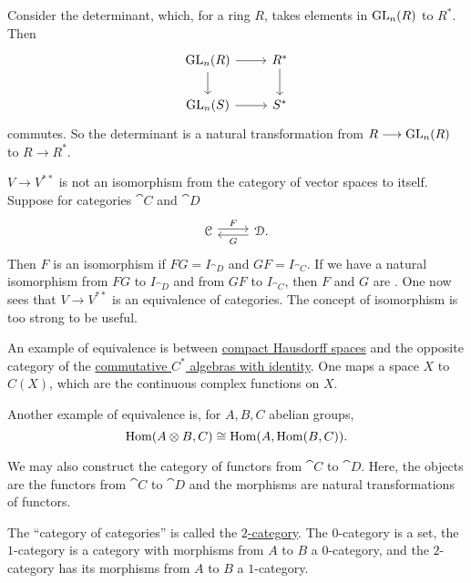 \documentclass[11pt, oneside]{article}
\begin{document}
Consider the determinant, which, for a ring $R$, takes elements in $\operatorname{GL}_n(R) $ to $R^*$. Then
\[
\begin{tikzcd}
\GL_n(R) \arrow[r] \arrow[d] & R^* \arrow[d]\\ \GL_n(S)  \arrow[r] & S^*
\end{tikzcd}
\]
commutes. So the determinant is a natural transformation from $R\longrightarrow \operatorname{GL}_n(R)$ to $R\longrightarrow R^*$.

$V\longrightarrow V^{**}$ is not an isomorphism from the category of vector spaces to itself. Suppose for categories $\cat C$ and $\cat D$
\[
\begin{tikzcd}
\cat C \arrow[r, shift left, "F"] & \cat D. \arrow[l, shift left, "G"]
\end{tikzcd}
\]
Then $F$ is an isomorphism if $FG = I_{\cat D}$ and $GF = I_{\cat C}$. If we have a natural isomorphism from $FG$ to $I_{\cat D}$ and from $GF$ to $I_{\cat C}$, then $F$ and $G$ are \href{https://en.wikipedia.org/wiki/Equivalence_of_categories}{}. One now sees that $V\longrightarrow V^{**}$ is an equivalence of categories. The concept of isomorphism is too strong to be useful.

An example of equivalence is \href{https://en.wikipedia.org/wiki/Gelfand_representation}{} between \href{https://en.wikipedia.org/wiki/Compact_space}{\color{black}compact Hausdorff spaces} and the opposite category of the \href{https://en.wikipedia.org/wiki/C*-algebra}{\color{black}commutative $C^*$ algebras with identity}. One maps a space $X$ to $C(X)$, which are the continuous complex functions on $X$.  %

Another example of equivalence is, for $A,B,C$ abelian groups, 
$$
\operatorname{Hom}(A\otimes B, C) \cong \operatorname{Hom}(A, \operatorname{Hom}(B,C)).
$$

We may also construct the category of functors from $\cat C$ to $\cat D$. Here, the objects are the functors from $\cat C$ to $\cat D$ and the morphisms are natural transformations of functors.

The ``category of categories'' is called the \href{https://en.wikipedia.org/wiki/Strict_2-category}{\color{black}$2$-category}. The $0$-category is a set, the $1$-category is a category with morphisms from $A$ to $B$ a $0$-category, and the $2$-category has its morphisms from $A$ to $B$ a $1$-category.  
\end{document}
